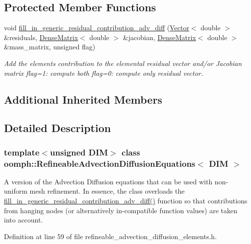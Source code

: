 \subsection*{Protected Member Functions}
\begin{DoxyCompactItemize}
\item 
void \hyperlink{classoomph_1_1RefineableAdvectionDiffusionEquations_aa42c5000c45380b8370565fac3990320}{fill\+\_\+in\+\_\+generic\+\_\+residual\+\_\+contribution\+\_\+adv\+\_\+diff} (\hyperlink{classoomph_1_1Vector}{Vector}$<$ double $>$ \&residuals, \hyperlink{classoomph_1_1DenseMatrix}{Dense\+Matrix}$<$ double $>$ \&jacobian, \hyperlink{classoomph_1_1DenseMatrix}{Dense\+Matrix}$<$ double $>$ \&mass\+\_\+matrix, unsigned flag)
\begin{DoxyCompactList}\small\item\em Add the element\textquotesingle{}s contribution to the elemental residual vector and/or Jacobian matrix flag=1\+: compute both flag=0\+: compute only residual vector. \end{DoxyCompactList}\end{DoxyCompactItemize}
\subsection*{Additional Inherited Members}


\subsection{Detailed Description}
\subsubsection*{template$<$unsigned D\+IM$>$\newline
class oomph\+::\+Refineable\+Advection\+Diffusion\+Equations$<$ D\+I\+M $>$}

A version of the Advection Diffusion equations that can be used with non-\/uniform mesh refinement. In essence, the class overloads the \hyperlink{classoomph_1_1RefineableAdvectionDiffusionEquations_aa42c5000c45380b8370565fac3990320}{fill\+\_\+in\+\_\+generic\+\_\+residual\+\_\+contribution\+\_\+adv\+\_\+diff()} function so that contributions from hanging nodes (or alternatively in-\/compatible function values) are taken into account. 

Definition at line 59 of file refineable\+\_\+advection\+\_\+diffusion\+\_\+elements.\+h.



